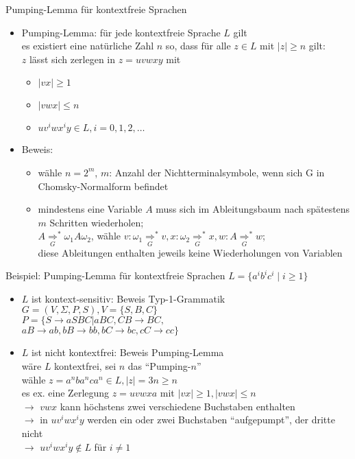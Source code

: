 \begin{frame}{Pumping-Lemma für kontextfreie Sprachen}
	\begin{itemize}
		\item Pumping-Lemma: für jede kontextfreie Sprache $L$ gilt\\
		es existiert eine natürliche Zahl $n$ so, dass für alle $z \in L$ mit $|z|\geq n$ gilt:\\
		$z$ lässt sich zerlegen in $z=uvwxy$ mit
		\begin{itemize}
			\item $|vx|\geq 1$
			\item $|vwx| \leq n$
			\item $uv^iwx^iy \in L, i=0, 1, 2, \ldots$
		\end{itemize}
		\item Beweis:
		\begin{itemize}
			\item wähle $n=2^m$, $m$: Anzahl der Nichtterminalsymbole, wenn sich G in Chomsky-Normalform befindet
			\item mindestens eine Variable $A$ muss sich im Ableitungsbaum nach spätestens $m$ Schritten wiederholen;\\
			$A\underset{G}{\Rightarrow}^*\omega_1 A \omega_2$, wähle $v: \omega_1 \underset{G}{\Rightarrow}^* v, x: \omega_2 \underset{G}{\Rightarrow}^* x, w: A \underset{G}{\Rightarrow}^* w$;\\
			diese Ableitungen enthalten jeweils keine Wiederholungen von Variablen
		\end{itemize}
	\end{itemize}
\end{frame}

\begin{frame}{Beispiel: Pumping-Lemma für kontextfreie Sprachen}
	$L=\{a^ib^ic^i \mid i\geq 1 \}$
	\begin{itemize}
		\item $L$ ist kontext-sensitiv: Beweis Typ-1-Grammatik\\
		$G=(V, \Sigma, P, S), V=\{S, B, C\}$\\
		$P=\{S\rightarrow aSBC | aBC, CB \rightarrow BC,$\\
		\qquad $aB \rightarrow ab, bB \rightarrow bb, bC \rightarrow bc, cC \rightarrow cc \}$
		\item $L$ ist nicht kontextfrei: Beweis Pumping-Lemma\\
		wäre $L$ kontextfrei, sei $n$ das "`Pumping-$n$"'\\
		wähle $z=a^nba^nca^n \in L, |z|=3n \geq n$\\
		es ex. eine Zerlegung $z=uvwxa$ mit $|vx|\geq 1, |vwx| \leq n$\\
		$\rightarrow$ $vwx$ kann höchstens zwei verschiedene Buchstaben enthalten\\
		$\rightarrow$ in $uv^iwx^iy$ werden ein oder zwei Buchstaben "`aufgepumpt"', der dritte nicht\\
		$\rightarrow$ $uv^iwx^iy \notin L$ für $i \neq 1$ \lightning 
	\end{itemize}
\end{frame}

